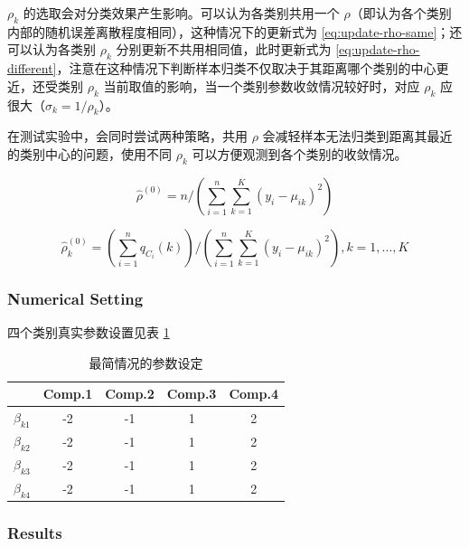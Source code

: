 \documentclass[12pt, a4paper, oneside]{article}
\numberwithin{equation}{section}
\begin{document}
$\rho_k$ 的选取会对分类效果产生影响。可以认为各类别共用一个 $\rho$（即认为各个类别内部的随机误差离散程度相同），这种情况下的更新式为 \ref{eq:update-rho-same}；还可以认为各类别 $\rho_k$ 分别更新不共用相同值，此时更新式为 \ref{eq:update-rho-different}，注意在这种情况下判断样本归类不仅取决于其距离哪个类别的中心更近，还受类别 $\rho_k$ 当前取值的影响，当一个类别参数收敛情况较好时，对应 $\rho_k$ 应很大（$\sigma_k = 1/\rho_k$）。

在测试实验中，会同时尝试两种策略，共用 $\rho$ 会减轻样本无法归类到距离其最近的类别中心的问题，使用不同 $\rho_k$ 可以方便观测到各个类别的收敛情况。

\begin{equation}
	\hat\rho^{(0)} = n/\left(\sum_{i=1}^{n}\sum_{k=1}^{K}(y_i - \mu_{ik})^2\right)
	\label{eq:update-rho-same}
\end{equation}

\begin{equation}
	\hat\rho_k^{(0)} = \left(\sum_{i=1}^{n}q_{C_i}(k)\right)/\left(\sum_{i=1}^{n}\sum_{k=1}^{K}(y_i - \mu_{ik})^2\right), k=1,...,K
	\label{eq:update-rho-different}
\end{equation}

\subsubsection{Numerical Setting}

四个类别真实参数设置见表 \ref{tb:coef_true_simple}

\begin{table}[h]
	\centering
	\caption{最简情况的参数设定}
	\begin{tabular}{ccccc}
		\toprule
		& Comp.1 & Comp.2 & Comp.3 & Comp.4 \\
		\midrule
		$\beta_{k1}$  & -2      & -1      & 1      & 2     \\
		$\beta_{k2}$  & -2      & -1      & 1      & 2     \\
		$\beta_{k3}$  & -2      & -1      & 1      & 2      \\
		$\beta_{k4}$  & -2      & -1      & 1      & 2      \\
		\bottomrule
	\end{tabular}
	\label{tb:coef_true_simple}
\end{table}

\subsubsection{Results}
\end{document}
